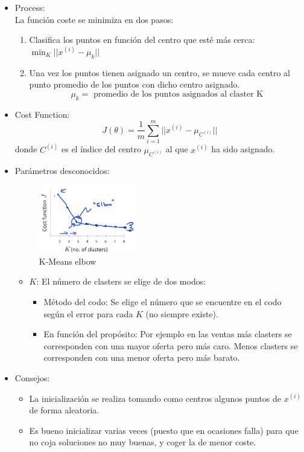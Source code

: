 \documentclass[12pt,a4paper]{article}
\begin{document}
\begin{itemize}
\item Process: 
\\
La función coste se minimiza en dos pasos:
\begin{enumerate}
\item Clasifica los puntos en función del centro que esté más cerca: $\min_{K} ||x^{(i)}-\mu_{k}||$
\item Una vez los puntos tienen asignado un centro, se mueve cada centro al punto promedio de los puntos con dicho centro asignado.
\begin{equation*}
\mu_k=\mbox{ promedio de los puntos asignados al claster K}
\end{equation*}
\end{enumerate}
\item Cost Function:
\begin{equation*}
J(\theta)=\dfrac{1}{m} \sum_{i=1}^{m} || x^{(i)}-\mu_{C^{(i)}}|| 
\end{equation*}
donde $C^{(i)}$ es el índice del centro $\mu_{C^{(i)}}$ al que $x^{(i)}$ ha sido asignado.
\item Parámetros desconocidos:
\begin{figure}[htb]
\center
\includegraphics[width=0.4\textwidth]{elbow}
\caption{K-Means elbow}
\end{figure}
\begin{itemize}
\item $K$: El número de clasters se elige de dos modos:
\begin{itemize}
\item Método del codo: Se elige el número que se encuentre en el codo según el error para cada $K$ (no siempre existe).
\item En función del propósito: Por ejemplo en las ventas más clasters se corresponden con una mayor oferta pero más caro. Menos clasters se corresponden con una menor oferta pero más barato.
\end{itemize}
\end{itemize}
\item Consejos:
\begin{itemize}
\item La inicialización se realiza tomando como centros algunos puntos de $x^{(i)}$ de forma aleatoria.
\item Es bueno inicializar varias veces (puesto que en ocasiones falla) para que no coja soluciones no muy buenas, y coger la de menor coste.
\end{itemize}
\end{itemize}
\end{document}

